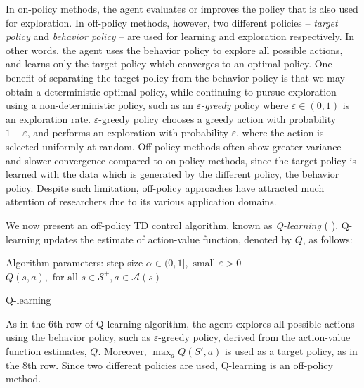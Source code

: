 In on-policy methods, the agent evaluates or improves the policy that is also used for exploration. In off-policy methods, however, two different policies -- \textit{target policy} and \textit{behavior policy} -- are used for learning and exploration respectively. In other words, the agent uses the behavior policy to explore all possible actions, and learns only the target policy which converges to an optimal policy. One benefit of separating the target policy from the behavior policy is that we may obtain a deterministic optimal policy, while continuing to pursue exploration using a non-deterministic policy, such as an \textit{$\varepsilon$-greedy} policy where $\varepsilon \in (0,1)$ is an exploration rate. $\varepsilon$-greedy policy chooses a greedy action with probability $1-\varepsilon$, and performs an exploration with probability $\varepsilon$, where the action is selected uniformly at random. Off-policy methods often show greater variance and slower convergence compared to on-policy methods, since the target policy is learned with the data which is generated by the different policy, the behavior policy. Despite such limitation, off-policy approaches have attracted much attention of researchers due to its various application domains.
\clearpage

We now present an off-policy TD control algorithm, known as \textit{Q-learning} (\citeauthor{watkins1989learning} \cite{watkins1989learning}). Q-learning updates the estimate of action-value function, denoted by $Q$, as follows:

\begin{algorithm}[H]
\SetAlgoLined
 Algorithm parameters: step size $\alpha \in (0,1], \text{ small } \varepsilon > 0$ \\
  $Q(s,a), \text{ for all } s\in \mathcal{S}^+, a\in\mathcal{A}(s)$ \\
 \caption{Q-learning}
\end{algorithm}
As in the 6th row of Q-learning algorithm, the agent explores all possible actions using the behavior policy, such as $\varepsilon$-greedy policy, derived from the action-value function estimates, $Q$. Moreover, $\max_a Q(S', a)$ is used as a target policy, as in the 8th row. Since two different policies are used, Q-learning is an off-policy method.

